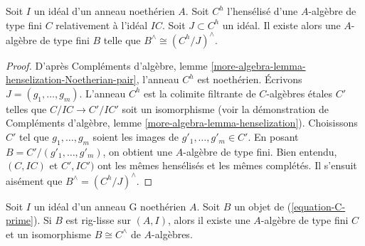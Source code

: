 \begin{lemma}
\label{lemma-algebraize-easy}
Soit $I$ un idéal d'un anneau noethérien $A$. Soit $C^h$ l'hensélisé d'une
$A$-algèbre de type fini $C$ relativement à l'idéal $IC$. Soit
$J \subset C^h$ un idéal. Il existe alors une $A$-algèbre de type fini $B$
telle que $B^\wedge \cong (C^h/J)^\wedge$.
\end{lemma}

\begin{proof}
D'après Compléments d'algèbre, lemme
\ref{more-algebra-lemma-henselization-Noetherian-pair}, l'anneau $C^h$ est
noethérien. Écrivons $J = (g_1, \ldots, g_m)$. L'anneau $C^h$ est la colimite
filtrante de $C$-algèbres étales $C'$ telles que
$C/IC \to C'/IC'$ soit un isomorphisme (voir la démonstration de Compléments
d'algèbre, lemme \ref{more-algebra-lemma-henselization}). Choisissons $C'$ tel
que $g_1, \ldots, g_m$ soient les images de
$g'_1, \ldots, g'_m \in C'$. En posant
$B = C'/(g'_1, \ldots, g'_m)$, on obtient une $A$-algèbre de type fini. Bien
entendu, $(C, IC)$ et $C', IC')$ ont les mêmes hensélisés et les mêmes
complétés. Il s'ensuit aisément que $B^\wedge = (C^h/J)^\wedge$.
\end{proof}

\begin{proposition}
\label{proposition-approximate}
Soit $I$ un idéal d'un anneau G noethérien $A$. Soit $B$ un objet de
(\ref{equation-C-prime}). Si $B$ est rig-lisse sur $(A, I)$, alors il existe
une $A$-algèbre de type fini $C$ et un isomorphisme
$B \cong C^\wedge$ de $A$-algèbres.
\end{proposition}

